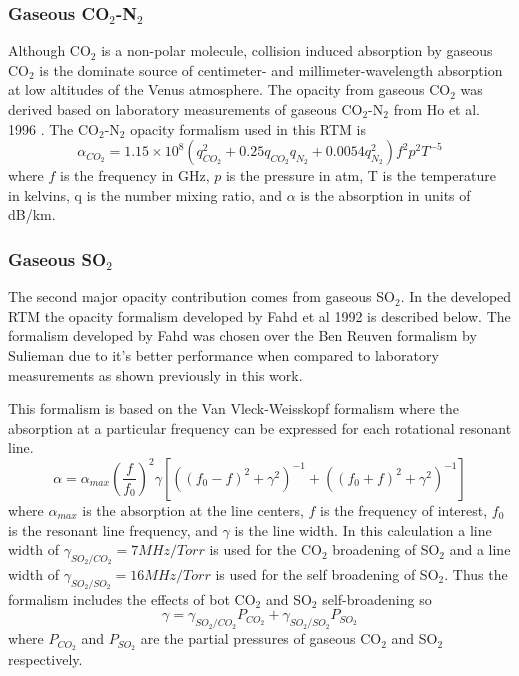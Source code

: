 \subsubsection{Gaseous CO$_2$-N$_2$}
Although CO$_2$ is a non-polar molecule, collision induced absorption by gaseous CO$_2$ \cite{Barret-1961} is the dominate source of centimeter- and millimeter-wavelength absorption at low altitudes of the Venus atmosphere. The opacity from gaseous CO$_2$ was derived based on laboratory measurements of gaseous CO$_2$-N$_2$ from Ho et al. 1996 \cite{Ho-1996}. The CO$_2$-N$_2$ opacity formalism used in this RTM is
\begin{equation}\label{eq:rtm-co2n2}
\alpha_{CO_2} = 1.15\times 10^8(q_{CO_2}^2 + 0.25q_{CO_2}q_{N_2} + 0.0054q_{N_2}^2)f^2p^2T^{-5}
\end{equation}
where $f$ is the frequency in GHz, $p$ is the pressure in atm, T is the temperature in kelvins, q is the number mixing ratio, and $\alpha$ is the absorption in units of dB/km.

\subsubsection{Gaseous SO$_2$}
The second major opacity contribution comes from gaseous SO$_2$. In the developed RTM the opacity formalism developed by Fahd et al 1992 \cite{Fahd-thesis} is described below. The formalism developed by Fahd was chosen over the Ben Reuven formalism by Sulieman due to it's better performance when compared to laboratory measurements as shown previously in this work.

This formalism is based on the Van Vleck-Weisskopf formalism where the absorption at a particular frequency can be expressed for each rotational resonant line. 
\begin{equation}
\label{eq:rtm-so2fahd}
\alpha = \alpha_{max} \left(\frac{f}{f_0}\right)^2 \gamma [((f_0-f)^2+\gamma^2)^{-1}+((f_0+f)^2 + \gamma^2)^{-1}]
\end{equation}
where $\alpha_{max}$ is the absorption at the line centers, $f$ is the frequency of interest, $f_0$ is the resonant line frequency, and $\gamma$ is the line width. In this calculation a line width of $\gamma_{SO_2/CO_2} = 7MHz/Torr$ is used for the CO$_2$ broadening of SO$_2$ and a line width of $\gamma_{SO_2/SO_2} = 16MHz/Torr$ is used for the self broadening of SO$_2$. Thus the formalism includes the effects of bot CO$_2$ and SO$_2$ self-broadening so 
\begin{equation}
\gamma = \gamma_{SO_2/CO_2}P_{CO_2} + \gamma_{SO_2/SO_2}P_{SO_2}
\end{equation}
where $P_{CO_2}$ and $P_{SO_2}$ are the partial pressures of gaseous CO$_2$ and SO$_2$ respectively.

